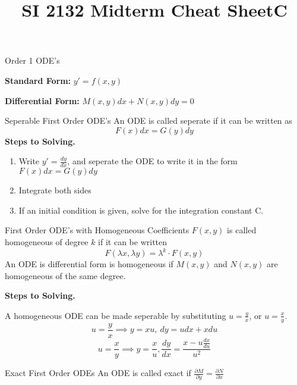 \documentclass{article}
\title{SI 2132 Midterm Cheat SheetC}
\begin{document}
\begin{multicols*}{3}
    \begin{blackbox}{Order 1 ODE's}
        {\footnotesize
        \textbf{Standard Form:} $y' = f(x,y)$
    
        \textbf{Differential Form:} $M(x,y)dx + N(x,y)dy = 0$
    
        \begin{bluebox}{Seperable First Order ODE's}
            An ODE is called seperate if it can be written as \\[-2ex]
            \[F(x)dx = G(y)dy\]
            \textbf{Steps to Solving.}
                \begin{enumerate}[leftmargin=7pt]
                    \item Write $y' = \frac{dy}{dx}$, and seperate the ODE to write it in the form $F(x)dx = G(y)dy$
                    \item Integrate both sides
                    \item If an initial condition is given, solve for the integration constant C. 
                \end{enumerate}
        \end{bluebox}
        \begin{brownbox}{First Order ODE's with Homogeneous Coefficients}
            $F(x,y)$ is called homogeneous of degree $k$ if it can be written\\[-4ex]
            \[F(\lambda x, \lambda y) = \lambda^k \cdot F(x,y)\]
            An ODE is differential form is homogeneous if $M(x,y)$ and $N(x,y)$ are homogeneous of the same degree.

            \textbf{Steps to Solving.}

                A homogeneous ODE can be made seperable by substituting $u = \frac{y}{x}$, or $u = \frac{x}{y}$.\\[-2ex]
                \[u = \frac{y}{x} \implies y = xu, \ dy = udx + xdu\]
                \vspace{-3ex}
                \[u = \frac{x}{y} \implies y = \frac{x}{u}, \frac{dy}{dx} = \frac{x - u\frac{dx}{du}}{u^2}\]
        \end{brownbox}
        
        \begin{bluebox}{Exact First Order ODEs}
            An ODE is called exact if $\frac{\partial M}{\partial y} = \frac{\partial N}{\partial x}$


\end{bluebox}}
\end{blackbox}
\end{multicols*}
\end{document}
